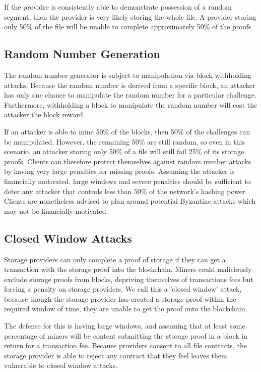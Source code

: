 \documentclass[twocolumn]{article}
\begin{document}
If the providre is consistently able to demonstrate possession of a random segment, then the provider is very likely storing the whole file.
A provider storing only 50\% of the file will be unable to complete approximately 50\% of the proofs.

\subsection{Random Number Generation}
The random number generator is subject to manipulation via block withholding attacks.
Because the random number is derived from a specific block, an attacker has only one chance to manipulate the random number for a particular challenge.
Furthermore, withholding a block to manipulate the random number will cost the attacker the block reward.

If an attacker is able to mine 50\% of the blocks, then 50\% of the challenges can be manipulated.
However, the remaining 50\% are still random, so even in this scenario, an attacker storing only 50\% of a file will still fail 25\% of its storage proofs.
Clients can therefore protect themselves against random number attacks by having very large penalties for missing proofs.
Assuming the attacker is financially motivated, large windows and severe penalties should be sufficient to deter any attacker that controls less than 50\% of the network's hashing power.
Clients are nonetheless advised to plan around potential Byzantine attacks which may not be financially motivated.

\subsection{Closed Window Attacks}
Storage providers can only complete a proof of storage if they can get a transaction with the storage proof into the blockchain.
Miners could maliciously exclude storage proofs from blocks, depriving themselves of transactions fees but forcing a penalty on storage providers.
We call this a 'closed window' attack, because though the storage provider has created a storage proof within the required window of time, they are unable to get the proof onto the blockchain.

The defense for this is having large windows, and assuming that at least some percentage of miners will be content submitting the storage proof in a block in return for a transaction fee.
Because providers consent to all file contracts, the storage provider is able to reject any contract that they feel leaves them vulnerable to closed window attacks.
\end{document}
